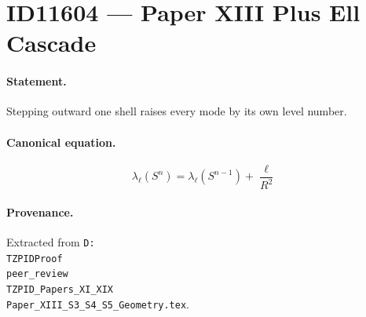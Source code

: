 \section*{ID11604 --- Paper XIII Plus Ell Cascade}

\paragraph{Statement.}
Stepping outward one shell raises every mode by its own level number.

\paragraph{Canonical equation.}
\[
\lambda_\ell(S^n)=\lambda_\ell(S^{n-1})+\frac{\ell}{R^2}
\]

\paragraph{Provenance.}
Extracted from \texttt{D:\\TZPIDProof\\peer\_review\\TZPID\_Papers\_XI\_XIX\\Paper\_XIII\_S3\_S4\_S5\_Geometry.tex}.
